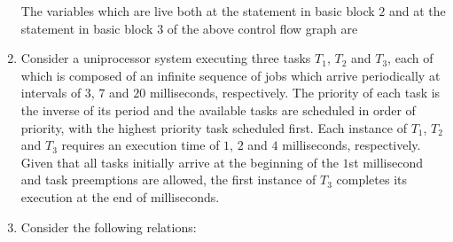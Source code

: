 \documentclass[journal,12pt,onecolumn]{IEEEtran}
\theoremstyle{remark}
\begin{document}
\begin{enumerate}[resume]
		
		The variables which are live both at the statement in basic block $2$ and at the statement in basic block $3$ of the above control flow graph are
		
		\hfill{}
		
		\begin{enumerate}
		\end{enumerate}
		
		\item Consider a uniprocessor system executing three tasks $T_1$, $T_2$ and $T_3$, each of which is composed of an infinite sequence of jobs  which arrive periodically at intervals of $3$, $7$ and $20$ milliseconds, respectively. The priority of each task is the inverse of its period and the available tasks are scheduled in order of priority, with the highest priority task scheduled first. Each instance of $T_1$, $T_2$ and $T_3$ requires an execution time of $1$, $2$ and $4$ milliseconds, respectively. Given that all tasks initially arrive at the beginning of the $1$st millisecond and task preemptions are allowed, the first instance of $T_3$ completes its execution at the end of \underline{\hspace{2cm}} milliseconds.
		
		\hfill{}
		
		\item Consider the following relations:
		

\end{enumerate}
\end{document}

